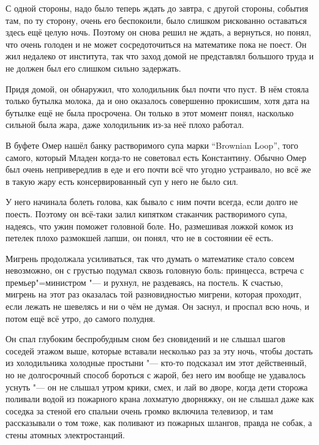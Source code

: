С одной стороны, надо было теперь ждать до завтра, с другой стороны, события
там, по ту сторону, очень его беспокоили, было слишком рискованно оставаться
здесь ещё целую ночь.
Поэтому он снова решил не ждать, а вернуться, но понял, что очень голоден и не
может сосредоточиться на математике пока не поест.
Он жил недалеко от института, так что заход домой не представлял большого труда
и не должен был его слишком сильно задержать.

Придя домой, он обнаружил, что холодильник был почти что пуст.
В нём стояла только бутылка молока, да и оно оказалось совершенно прокисшим,
хотя дата на бутылке ещё не была просрочена.
Он только в этот момент понял, насколько сильной была жара, даже холодильник
из-за неё плохо работал.

В буфете Омер нашёл банку растворимого супа марки
\enquote{\foreignlanguage{english}{Brownian Loop}},
того самого, который Младен когда-то не советовал есть Константину.
Обычно Омер был очень непривередлив в еде и его почти всё что угодно устраивало,
но всё же в такую жару есть консервированный суп у него не было сил.

У него начинала болеть голова, как бывало с ним почти всегда, если долго не
поесть.
Поэтому он всё-таки залил кипятком стаканчик растворимого супа, надеясь, что
ужин поможет головной боле.
Но, размешивая ложкой комок из петелек плохо размокшей лапши, он понял, что не в
состоянии её есть.

Мигрень продолжала усиливаться, так что думать о математике стало совсем
невозможно, он с грустью подумал сквозь головную боль: принцесса, встреча с
премьер"=министром "--- и рухнул, не раздеваясь, на постель.
К счастью, мигрень на этот раз оказалась той разновидностью мигрени, которая
проходит, если лежать не шевелясь и ни о чём не думая.
Он заснул, и проспал всю ночь, и потом ещё всё утро, до самого полудня.

Он спал глубоким беспробудным сном без сновидений и не слышал шагов соседей
этажом выше, которые вставали несколько раз за эту ночь, чтобы достать из
холодильника холодные простыни "--- кто-то подсказал им этот действенный, но
не долгосрочный способ бороться с жарой, без него им вообще не удавалось уснуть
"--- он не слышал утром крики, смех, и лай во дворе, когда дети сторожа поливали
водой из пожарного крана лохматую дворняжку, он не слышал даже как соседка за
стеной его спальни очень громко включила телевизор, и там рассказывали о том
тоже, как поливают из пожарных шлангов, правда не собак, а стены атомных
электростанций.

